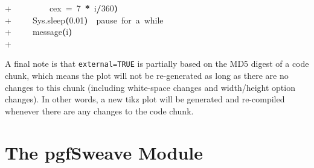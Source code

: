 \documentclass[english,noae,nogin]{article}
\newcommand{\hlnumber}[1]{\textcolor[rgb]{0.0823529411764706,0.0784313725490196,0.709803921568627}{#1}}%
\newcommand{\hlfunctioncall}[1]{\textcolor[rgb]{1,0,0}{#1}}%
\newcommand{\hlkeyword}[1]{\textcolor[rgb]{0,0,0}{\textbf{#1}}}%
\newcommand{\hlargument}[1]{\textcolor[rgb]{0.694117647058824,0.247058823529412,0.0196078431372549}{#1}}%
\newcommand{\hlcomment}[1]{\textcolor[rgb]{0.8,0.8,0.8}{#1}}%
\newcommand{\hlsymbol}[1]{\textcolor[rgb]{0,0,0}{#1}}%
\newcommand{\hlprompt}[1]{\textcolor[rgb]{0,0,0}{#1}}%
\newcommand{\hlstd}[1]{\textcolor[rgb]{0,0,0}{#1}}%
\newenvironment{Houtput}{\raggedright}{%
%
}
\begin{document}
\begin{Houtput}
\hlstd{}\hlprompt{+{\ }}{\ }{\ }{\ }{\ }{\ }{\ }{\ }{\ }\hlargument{cex}{\ }\hlargument{=}{\ }\hlnumber{7}{\ }\hlkeyword{*}{\ }\hlsymbol{i}\hlkeyword{/}\hlnumber{360}\hlkeyword{)}\hspace*{\fill}\\
\hlstd{}\hlprompt{+{\ }}{\ }{\ }{\ }{\ }\hlfunctioncall{Sys.sleep}\hlkeyword{(}\hlnumber{0.01}\hlkeyword{)}{\ }{\ }\hlcomment{\usebox{\hlnormalsizeboxhash}{\ }pause{\ }for{\ }a{\ }while}\hspace*{\fill}\\
\hlstd{}\hlprompt{+{\ }}{\ }{\ }{\ }{\ }\hlfunctioncall{message}\hlkeyword{(}\hlsymbol{i}\hlkeyword{)}\hspace*{\fill}\\
\hlstd{}\hlprompt{+{\ }}\hlkeyword{\usebox{\hlnormalsizeboxclosebrace}}\mbox{}
\normalfont
\hspace*{\fill}\\
\hlstd{}
\end{Houtput}

A final note is that \texttt{external=TRUE} is partially based on
the MD5 digest of a code chunk, which means the plot will not be re-generated
as long as there are no changes to this chunk (including white-space
changes and width/height option changes). In other words, a new tikz
plot will be generated and re-compiled whenever there are any changes
to the code chunk.


\section{The \textsf{pgfSweave} Module}
\end{document}
